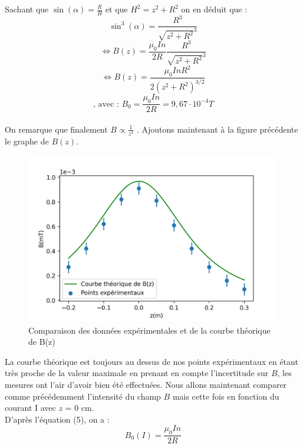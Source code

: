 \documentclass[12pt,a4paper]{article}
\begin{document}
Sachant que $\sin(\alpha) = \frac{R}{H}$ et que $H^2=z^2+R^2$ on en déduit que :
\begin{equation}
\sin^3(\alpha) = \frac{R^3}{\sqrt{z^2+R^2}^3}
\end{equation}
\begin{equation}
\Longleftrightarrow B(z) = \frac{\mu_{0}In}{2R}\frac{R^3}{\sqrt{z^2+R^2}^3}
\end{equation}
\begin{equation}
\Longleftrightarrow B(z) = \frac{\mu_{0}InR^2}{2(z^2+R^2)^{3/2}}
\end{equation}
\begin{equation}
\text{, avec : } B_0 = \frac{\mu_0In}{2R} = 9,67\cdot10^{-4} T
\end{equation}
\\
On remarque que finalement $B\varpropto\frac{1}{z^3}$ . Ajoutons maintenant à la figure précédente le graphe de $B(z)$.
\begin{figure}[H]
\begin{center}
\includegraphics[scale=0.8]{c1.png}
\caption{Comparaison des données expérimentales et de la courbe théorique de B(z)}
\end{center}
\end{figure}
La courbe théorique est toujours au dessus de nos points expérimentaux en étant très proche de la valeur maximale en prenant en compte l'incertitude sur $B$, les mesures ont l'air d'avoir bien été effectuées.
Nous allons maintenant comparer comme précédemment l'intensité du champ $B$ mais cette fois en fonction du courant I avec $z$ = 0 cm.\\
D'après l'équation (5), on a :
\begin{equation}
B_0(I) = \frac{\mu_0In}{2R}
\end{equation}
\end{document}
